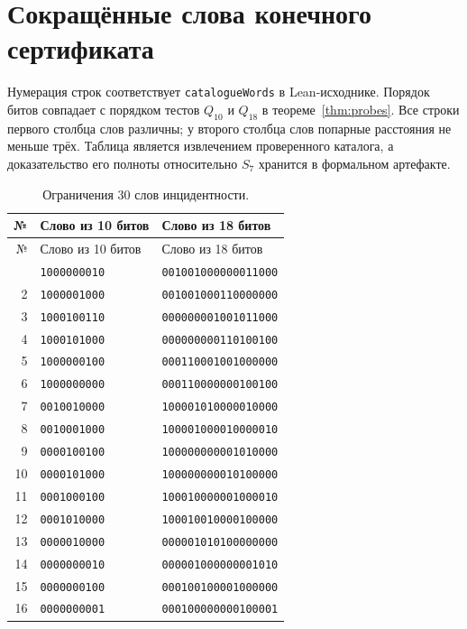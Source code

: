 \documentclass[11pt,a4paper]{article}
\renewcommand{\arraystretch}{1.2}
\numberwithin{equation}{section}
\theoremstyle{definition}
\theoremstyle{remark}
\begin{document}
\section{Сокращённые слова конечного сертификата}
Нумерация строк соответствует \nolinkurl{catalogueWords} в Lean-исходнике.
Порядок битов совпадает с порядком тестов $Q_{10}$ и $Q_{18}$
в теореме~\ref{thm:probes}. Все строки первого столбца слов различны;
у второго столбца слов попарные расстояния не меньше трёх.
Таблица является извлечением проверенного каталога, а доказательство
его полноты относительно $S_7$ хранится в формальном артефакте.
\begingroup\small\renewcommand{\arraystretch}{1.02}
\begin{longtable}{@{}rll@{}}
\caption{Ограничения 30 слов инцидентности.}\label{tab:words}\\
\toprule
№ & Слово из 10 битов & Слово из 18 битов\\
\midrule\endfirsthead
\toprule
№ & Слово из 10 битов & Слово из 18 битов\\
\midrule\endhead
\bottomrule\endfoot
1 & \texttt{1000000010} & \texttt{001001000000011000} \\
2 & \texttt{1000001000} & \texttt{001001000110000000} \\
3 & \texttt{1000100110} & \texttt{000000001001011000} \\
4 & \texttt{1000101000} & \texttt{000000000110100100} \\
5 & \texttt{1000000100} & \texttt{000110001001000000} \\
6 & \texttt{1000000000} & \texttt{000110000000100100} \\
7 & \texttt{0010010000} & \texttt{100001010000010000} \\
8 & \texttt{0010001000} & \texttt{100001000010000010} \\
9 & \texttt{0000100100} & \texttt{100000000001010000} \\
10 & \texttt{0000101000} & \texttt{100000000010100000} \\
11 & \texttt{0001000100} & \texttt{100010000001000010} \\
12 & \texttt{0001010000} & \texttt{100010010000100000} \\
13 & \texttt{0000010000} & \texttt{000001010100000000} \\
14 & \texttt{0000000010} & \texttt{000001000000001010} \\
15 & \texttt{0000000100} & \texttt{000100100001000000} \\
16 & \texttt{0000000001} & \texttt{000100000000100001} \\

\end{longtable}
\end{document}
